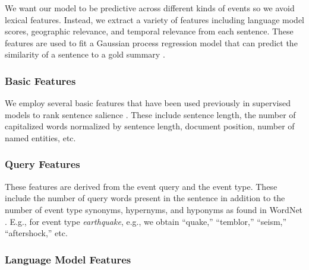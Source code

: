  

We want our model to be predictive across different kinds of events so we
avoid lexical features.  Instead, we extract a variety of features including
language model scores, geographic relevance, and temporal relevance from each
sentence.  These features are used to fit a Gaussian process regression model
that can predict the similarity of a sentence to a gold summary
\cite{preotiuc2013temporal}.  

\subsubsection{Basic Features}

We employ several basic features that have been used previously in supervised
models to rank sentence salience \cite{kupiec1995trainable,conroy2001using}.
These include sentence length, the number of capitalized words normalized by
sentence length, document position, number of named entities, etc.

\subsubsection{Query Features}

These features are derived from the event query and the event type.
These include the number of query words present in the sentence
in addition to the number of event type synonyms, hypernyms, and hyponyms
as found in WordNet \cite{miller1995wordnet}.
E.g., for event type \emph{earthquake}, e.g., we obtain ``quake,'' ``temblor,''
``seism,'' ``aftershock,'' etc.   


\subsubsection{Language Model Features}\label{subsubsec:lm}

